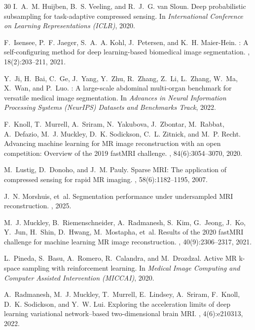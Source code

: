 \documentclass[10pt,twocolumn,letterpaper]{article}
\begin{document}
\begin{thebibliography}{30}
I.~A.~M. Huijben, B.~S. Veeling, and R.~J.~G. van Sloun.
\newblock Deep probabilistic subsampling for task-adaptive compressed sensing.
\newblock In {\em International Conference on Learning Representations (ICLR)}, 2020.

F.~Isensee, P.~F. Jaeger, S.~A.~A. Kohl, J.~Petersen, and K.~H. Maier-Hein.
: A self-configuring method for deep learning-based biomedical image segmentation.
, 18(2):203--211, 2021.

Y.~Ji, H.~Bai, C.~Ge, J.~Yang, Y.~Zhu, R.~Zhang, Z.~Li, L.~Zhang, W.~Ma, X.~Wan, and P.~Luo.
: A large-scale abdominal multi-organ benchmark for versatile medical image segmentation.
\newblock In {\em Advances in Neural Information Processing Systems (NeurIPS) Datasets and Benchmarks Track}, 2022.

F.~Knoll, T.~Murrell, A.~Sriram, N.~Yakubova, J.~Zbontar, M.~Rabbat, A.~Defazio, M.~J. Muckley, D.~K. Sodickson, C.~L. Zitnick, and M.~P. Recht.
\newblock Advancing machine learning for {MR} image reconstruction with an open competition: Overview of the 2019 {fastMRI} challenge.
, 84(6):3054--3070, 2020.

M.~Lustig, D.~Donoho, and J.~M. Pauly.
\newblock Sparse {MRI}: The application of compressed sensing for rapid {MR} imaging.
, 58(6):1182--1195, 2007.

J.~N. Morshuis, et~al.
\newblock Segmentation performance under undersampled {MRI} reconstruction.
, 2025.

M.~J. Muckley, B.~Riemenschneider, A.~Radmanesh, S.~Kim, G.~Jeong, J.~Ko, Y.~Jun, H.~Shin, D.~Hwang, M.~Mostapha, et~al.
\newblock Results of the 2020 {fastMRI} challenge for machine learning {MR} image reconstruction.
, 40(9):2306--2317, 2021.

L.~Pineda, S.~Basu, A.~Romero, R.~Calandra, and M.~Drozdzal.
\newblock Active {MR} k-space sampling with reinforcement learning.
\newblock In {\em Medical Image Computing and Computer Assisted Intervention (MICCAI)}, 2020.

A.~Radmanesh, M.~J. Muckley, T.~Murrell, E.~Lindsey, A.~Sriram, F.~Knoll, D.~K. Sodickson, and Y.~W. Lui.
\newblock Exploring the acceleration limits of deep learning variational network--based two-dimensional brain {MRI}.
, 4(6):e210313, 2022.


\end{thebibliography}
\end{document}
